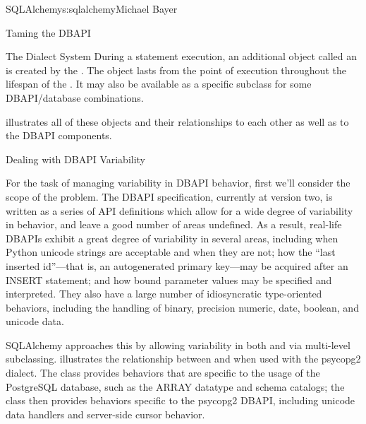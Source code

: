 \begin{aosachapter}{SQLAlchemy}{s:sqlalchemy}{Michael Bayer}
\begin{aosasect1}{Taming the DBAPI}
\begin{aosasect2}{The Dialect System}
During a statement execution, an additional object called an
 is created by the . The object lasts from the
point of execution throughout the lifespan of the . It
may also be available as a specific subclass for some DBAPI/database
combinations.

 illustrates all of these objects and their relationships to each
other as well as to the DBAPI components.


\end{aosasect2}

\begin{aosasect2}{Dealing with DBAPI Variability}

For the task of managing variability in DBAPI behavior,
first we'll consider the scope of the problem. The DBAPI
specification, currently at version two, is written as a series of
API definitions which allow for a wide degree of variability in
behavior, and leave a good number of areas undefined.  As a result, real-life
DBAPIs exhibit a great degree of variability
in several areas, including when Python
unicode strings are acceptable and when they are not; how the
``last inserted id''---that is, an autogenerated primary key---may be
acquired after an INSERT statement; and how bound parameter values
may be specified and interpreted. They also have a large number of idiosyncratic type-oriented
behaviors, including the handling of binary, precision numeric, date,
boolean, and unicode data.

SQLAlchemy approaches this by allowing variability in both  and
 via multi-level subclassing.    illustrates
the relationship between  and  when
used with the psycopg2 dialect.  The  class provides behaviors that
are specific to the usage of the PostgreSQL database, such as the ARRAY datatype
and schema catalogs; the 
class then provides behaviors specific to the psycopg2 DBAPI, including
unicode data handlers and server-side cursor behavior.



\end{aosasect2}
\end{aosasect1}
\end{aosachapter}
